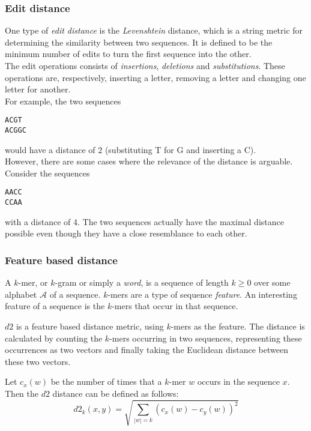 \documentclass[11pt,a4paper]{article}
\begin{document}
\subsubsection{Edit distance}
One type of \emph{edit distance} is the \emph{Levenshtein} distance, which is a
string metric for determining the similarity between two sequences. It is
defined to be the minimum number of edits to turn the first sequence into the
other. \\
The edit operations consists of \emph{insertions}, \emph{deletions} and
\emph{substitutions}. These operations are, respectively, inserting a letter,
removing a letter and changing one letter for another. \\
For example, the two sequences
\begin{center}
\texttt{ACGT} \\
\texttt{ACGGC}
\end{center}
would have a distance of 2 (substituting T for G and inserting a C). \\
However, there are some cases where the relevance of the distance is arguable.
Consider the sequences
\begin{center}
\texttt{AACC} \\
\texttt{CCAA}
\end{center}
with a distance of 4. The two sequences actually have the maximal distance
possible even though they have a close resemblance to each other.


\subsubsection{Feature based distance}
A $k$-mer, or $k$-gram or simply a \emph{word}, is a sequence of length
$k \geq 0$ over some alphabet $\mathcal{A}$ of a sequence. $k$-mers are a type
of sequence \emph{feature}. An interesting feature of a sequence is the
$k$-mers that occur in that sequence.

$d2$ is a feature based distance metric, using $k$-mers as the feature. The
distance is calculated by counting the $k$-mers occurring in two sequences,
representing these occurrences as two vectors and finally taking the Euclidean
distance between these two vectors.

Let $c_x(w)$ be the number of times that a $k$-mer $w$ occurs in the sequence
$x$. Then the $d2$ distance can be defined as follows:
\begin{equation}
  d2_k(x,y) = \sqrt{\sum_{|w|=k} (c_x(w) - c_y(w))^2}
\end{equation}
\end{document}

